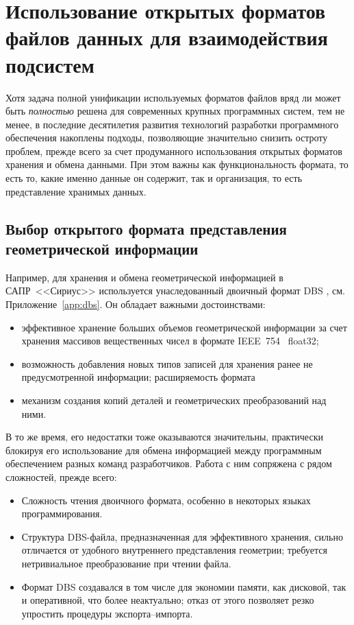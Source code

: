 
\section{%
  Использование открытых форматов файлов данных для взаимодействия подсистем
}
\label{sec:json.files}

Хотя задача полной унификации
используемых форматов файлов
вряд ли может быть
\textit{полностью}
решена для современных крупных программных систем,
тем не менее,
в последние десятилетия развития технологий
разработки программного обеспечения
накоплены подходы,
позволяющие значительно снизить остроту проблем,
прежде всего за счет продуманного использования
открытых форматов хранения и обмена данными.
При этом важны как функциональность формата,
то есть то, какие именно данные он содержит,
так и организация,
то есть представление
хранимых данных.

\subsection{%
Выбор открытого формата представления геометрической информации
}

Например, для хранения и обмена геометрической информацией
в САПР~<<Сириус>>
\cite{bi:sapr1999}
используется унаследованный двоичный формат DBS
\cite{bi:DBS},
см. Приложение~\ref{app:dbs}.
Он обладает важными достоинствами:
\begin{itemize}
  \item
  эффективное хранение больших объемов геометрической информации
  за счет хранения массивов вещественных чисел в формате IEEE~754~\cite{bi:IEEE754} float32;
  \item
  возможность добавления новых типов записей для хранения ранее не предусмотренной информации;
  расширяемость формата
  \item
  механизм создания копий деталей и геометрических преобразований над ними.
\end{itemize}

В то же время,
его недостатки тоже оказываются
значительны,
практически блокируя его использование
для обмена информацией между
программным обеспечением разных команд разработчиков.
Работа с ним сопряжена с рядом сложностей,
прежде всего:
\begin{itemize}
  \item
  Сложность чтения двоичного формата,
  особенно в некоторых языках программирования.
  \item
  Структура DBS-файла,
  предназначенная для эффективного хранения,
  сильно отличается от удобного внутреннего представления
  геометрии;
  требуется нетривиальное преобразование при чтении файла.
  \item
  Формат DBS создавался в том числе для экономии памяти,
  как дисковой, так и оперативной,
  что более неактуально;
  отказ от этого позволяет резко упростить процедуры экспорта--импорта.
\end{itemize}

